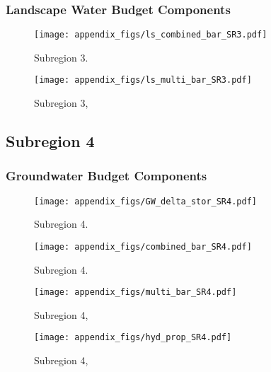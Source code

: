 \subsubsection{Landscape Water Budget Components}
\begin{figure}[ht]
\centerline{\texttt{[image: appendix\_figs/ls\_combined\_bar\_SR3.pdf]}}
\caption{\LSCombinedTextOne Subregion 3.\LSCombinedTextTwo}
\label{fig:LS_budget_SR3}
\end{figure}
\newpage

\begin{landscape}
\begin{figure}[ht]
\centerline{\texttt{[image: appendix\_figs/ls\_multi\_bar\_SR3.pdf]}}
\caption{\LSMultiTextOne Subregion 3,\LSMultiTextTwo}
\label{fig:multi_LS_budget_SR3}
\end{figure}
\newpage
\end{landscape}

\subsection{Subregion 4}
\subsubsection{Groundwater Budget Components}
\begin{figure}[h]
\centerline{\texttt{[image: appendix\_figs/GW\_delta\_stor\_SR4.pdf]}}
\caption{\GWBudgetText Subregion 4.}
\label{fig:delta_stor_SR4}
\end{figure}
\newpage

\begin{figure}[ht]
\centerline{\texttt{[image: appendix\_figs/combined\_bar\_SR4.pdf]}}
\caption{\GWCombinedTextOne Subregion 4.\GWCombinedTextTwo}
\label{fig:GW_budget_SR4}
\end{figure}
\newpage

\begin{landscape}
\begin{figure}[ht]
\centerline{\texttt{[image: appendix\_figs/multi\_bar\_SR4.pdf]}}
\caption{\GWMultiTextOne Subregion 4,\GWMultiTextTwo}
\label{fig:multi_GW_budget_SR4}
\end{figure}
\newpage

\begin{figure}[ht]
\centerline{\texttt{[image: appendix\_figs/hyd\_prop\_SR4.pdf]}}
\caption{\HydPropOne Subregion 4,\HydPropTwo}
\label{fig:hyd_prop_SR4}
\end{figure}
\newpage
\end{landscape}

